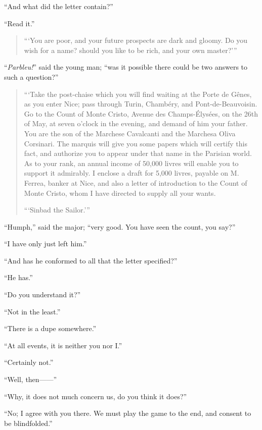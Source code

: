 “And what did the letter contain?”

“Read it.”

\begin{quote}
“‘You are poor, and your future prospects are dark and gloomy. Do you
wish for a name? should you like to be rich, and your own master?’”
\end{quote}

“\textit{Parbleu!}” said the young man; “was it possible there could be two
answers to such a question?”

\begin{quote}
{\small“‘Take the post-chaise which you will find waiting at the Porte de
Gênes, as you enter Nice; pass through Turin, Chambéry, and
Pont-de-Beauvoisin. Go to the Count of Monte Cristo, Avenue des
Champs-Élysées, on the 26th of May, at seven o’clock in the evening,
and demand of him your father. You are the son of the Marchese
Cavalcanti and the Marchesa Oliva Corsinari. The marquis will give you
some papers which will certify this fact, and authorize you to appear
under that name in the Parisian world. As to your rank, an annual
income of 50,000 livres will enable you to support it admirably. I
enclose a draft for 5,000 livres, payable on M. Ferrea, banker at Nice,
and also a letter of introduction to the Count of Monte Cristo, whom I
have directed to supply all your wants.

\begin{flushright}
“‘Sinbad the Sailor.’”
\end{flushright}}
\end{quote}

“Humph,” said the major; “very good. You have seen the count, you say?”

“I have only just left him.”

“And has he conformed to all that the letter specified?”

“He has.”

“Do you understand it?”

“Not in the least.”

“There is a dupe somewhere.”

“At all events, it is neither you nor I.”

“Certainly not.”

“Well, then——”

“Why, it does not much concern us, do you think it does?”

“No; I agree with you there. We must play the game to the end, and
consent to be blindfolded.”

